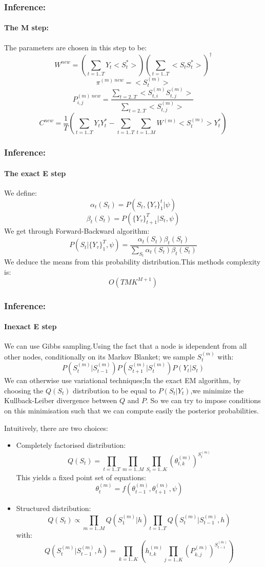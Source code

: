 \documentclass{beamer}
\begin{document}
    \begin{frame}
    \frametitle{Inference:}
    \framesubtitle{The M step:}
    The parameters are chosen in this step to be:
    \begin{equation}
    W^{new}=(\sum_{t=1..T}Y_t<S_t^*>)(\sum_{t=1..T}<S_tS_t^*>)^{\dagger}
    \end{equation}
    \begin{equation}
    \pi^{(m)\ new}=<S_t^{(m)}>
    \end{equation}
    \begin{equation}
    P_{i,j}^{(m)\ new}=\frac{\sum_{t=2..T}<S_{t,i}^{(m)}S_{t,j}^{(m)}>}{\sum_{t=2..T}<S_{t,j}^{(m)}>}
    \end{equation}
    \begin{equation}
    C^{new}=\frac{1}{T}(\sum_{t=1..T}Y_tY_t^*-\sum_{t=1..T}\sum_{t=1..M}W^{(m)}<S_t^{(m)}>Y_t^*)
    \end{equation}
    \end{frame}
    
    \begin{frame}
    \frametitle{Inference:}
    \framesubtitle{The exact E step}
    We define:
    $$\alpha_t(S_t)=P(S_t,\{Y_{\tau}\}_1^t|\psi)$$
    $$\beta_t(S_t)=P(\{Y_{\tau}\}_{t+1}^T|S_t,\psi)$$
    We get through Forward-Backward algorithm:
    $$P(S_t|\{Y_{\tau}\}_1^T,\psi)=\frac{\alpha_t(S_t)\beta_t(S_t)}{\sum_{S_t}\alpha_t(S_t)\beta_t(S_t)}$$
    We deduce the means from this probability distribution.This methods complexity is:
    $$O(TMK^{M+1})$$
    \end{frame}
    
    \begin{frame}
    \frametitle{Inference:}
    \framesubtitle{Inexact E step}
    We can use Gibbs sampling.Using the fact that a node is idependent from all other nodes, conditionally on its Markov Blanket; we sample $S_t^{(m)}$ with:
    $$P(S_t^{(m)}|S_{t-1}^{(m)})P(S_{t+1}^{(m)}|S_t^{(m)})P(Y_t|S_t)$$
    We can otherwise use variational techniques;In the exact EM algorithm, by choosing the $Q(S_t)$ distribution to be equal to $P(S_t|Y_t)$,we minimize the Kullback-Leiber divergence between $Q$ and $P$.
    So we can try to impose conditions on this minimisation such that we can compute easily the posterior probabilities.
    \end{frame}
    
    \begin{frame}
    Intuitively, there are two choices:
    \begin{itemize}
    \item Completely factorised distribution:
    $$Q(S_t)=\prod_{t=1..T}\prod_{m=1..M}\prod_{S_t=1..K}(\theta_{t,k}^{(m)})^{S_t^{(m)}}$$
    This yields a fixed point set of equations:
    $$\theta_{t}^{(m)}=f(\theta_{t-1}^{(m)},\theta_{t+1}^{(m)},\psi)$$
    \item Structured distribution:
    $$Q(S_t)\propto \prod_{m=1..M}Q(S_1^{(m)}|h)\prod_{t=1..T}Q(S_t^{(m)}|S_{t-1}^{(m)},h)$$
    with:
    $$Q(S_t^{(m)}|S_{t-1}^{(m)},h)=\prod_{k=1..K}(h_{t,k}^{(m)}\prod_{j=1..K}(P_{k,j}^{(m)})^{S_{t-1}^{(m)}})$$
    \end{itemize}
    \end{frame}
    
\end{document}
